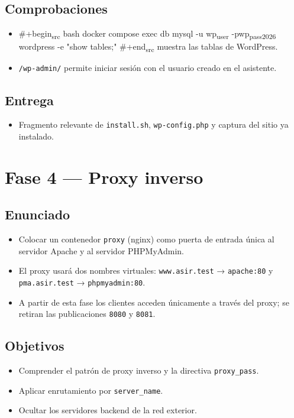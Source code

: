 \documentclass[11pt]{article}
\begin{document}
\subsection{Comprobaciones}
\label{sec:org000003f}
\begin{itemize}
\item \#+begin\textsubscript{src} bash
docker compose exec db mysql -u wp\textsubscript{user} -pwp\textsubscript{pass}\textsubscript{2026} wordpress -e "show tables;"
\#+end\textsubscript{src}
muestra las tablas de WordPress.
\item \texttt{/wp-admin/} permite iniciar sesión con el usuario creado en el asistente.
\end{itemize}
\subsection{Entrega}
\label{sec:org0000042}
\begin{itemize}
\item Fragmento relevante de \texttt{install.sh}, \texttt{wp-config.php} y captura del sitio ya
instalado.
\end{itemize}
\section{Fase 4 — Proxy inverso}
\label{sec:org0000057}

\subsection{Enunciado}
\label{sec:org0000048}
\begin{itemize}
\item Colocar un contenedor \texttt{proxy} (nginx) como puerta de entrada única al servidor
Apache y al servidor PHPMyAdmin.
\item El proxy usará dos nombres virtuales: \texttt{www.asir.test} → \texttt{apache:80} y
\texttt{pma.asir.test} → \texttt{phpmyadmin:80}.
\item A partir de esta fase los clientes acceden únicamente a través del proxy; se
retiran las publicaciones \texttt{8080} y \texttt{8081}.
\end{itemize}
\subsection{Objetivos}
\label{sec:org000004b}
\begin{itemize}
\item Comprender el patrón de proxy inverso y la directiva \texttt{proxy\_pass}.
\item Aplicar enrutamiento por \texttt{server\_name}.
\item Ocultar los servidores backend de la red exterior.
\end{itemize}
\end{document}
